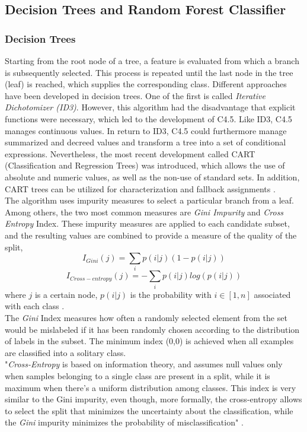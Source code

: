 \documentclass[a4paper, 11pt,titlepage,oneside,openany]{book}
\begin{document}
\subsection{Decision Trees and Random Forest Classifier}
\subsubsection{Decision Trees}
Starting from the root node of a tree, a feature is evaluated from which a branch is subsequently selected. This process is repeated until the last node in the tree (leaf) is reached, which supplies the corresponding class. Different approaches have been developed in decision trees. One of the first is called \textit{Iterative Dichotomizer (ID3)}. However, this algorithm had the disadvantage that explicit functions were necessary, which led to the development of C4.5. Like ID3, C4.5 manages continuous values. In return to ID3, C4.5 could furthermore manage summarized and decreed values and transform a tree into a set of conditional expressions. Nevertheless, the most recent development called CART (Classification and Regression Trees) was introduced, which allows the use of absolute and numeric values, as well as the non-use of standard sets. In addition, CART trees can be utilized for characterization and fallback assignments \cite{algorithms2}.\\
\noindent The algorithm uses impurity measures to select a particular branch from a leaf. Among others, the two most common measures are \textit{Gini Impurity} and \textit{Cross Entropy} Index. 
\newpage
\noindent These impurity measures are  applied to each candidate subset, and the resulting values are combined to provide a measure of the quality of the split,
\[
I_{Gini}(j)=\sum_{i}p(i|j)(1-p(i|j))
\]
\[
I_{Cross-entropy}(j)=-\sum_{i}p(i|j)log(p(i|j))
\]
where $j$ is a certain node, $p(i|j)$ is the probability with $i \in [1,n]$ associated with each class \cite{algorithms}.\\
\noindent The \textit{Gini} Index measures how often a randomly selected element from the set would be mislabeled if it has been randomly chosen according to the distribution of labels in the subset. The minimum index (0,0) is achieved when all examples are classified into a solitary class.\\
\noindent "\textit{Cross-Entropy} is based on information theory, and assumes null values only when samples belonging to a single class are present in a split, while it is maximum when there's a uniform distribution among classes. This index is very similar to the Gini impurity, even though, more formally, the cross-entropy allows to select the split that minimizes the uncertainty about the classification, while the \textit{Gini} impurity minimizes the probability of misclassification" \cite{algorithms}.
\end{document}
